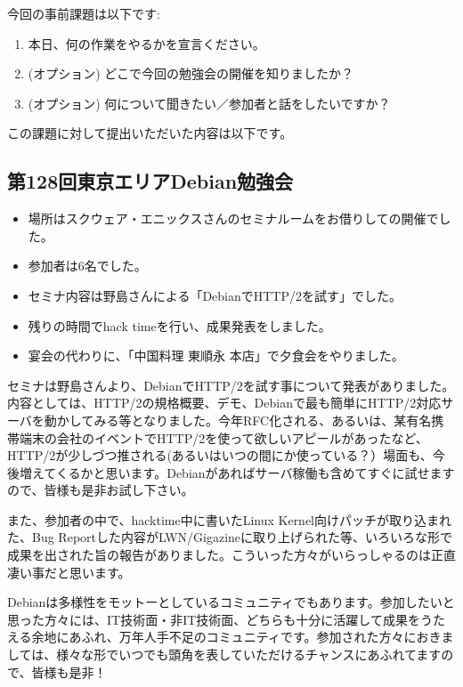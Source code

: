 \documentclass[mingoth,a4paper]{jsarticle}
\begin{document}

今回の事前課題は以下です:
\begin{enumerate}
\item 本日、何の作業をやるかを宣言ください。
\item (オプション) どこで今回の勉強会の開催を知りましたか？
\item (オプション) 何について聞きたい／参加者と話をしたいですか？
\end{enumerate}
この課題に対して提出いただいた内容は以下です。
\begin{multicols}{2}
{\small

}
\end{multicols}


\subsection{第128回東京エリアDebian勉強会}

\begin{itemize}
\item 場所はスクウェア・エニックスさんのセミナルームをお借りしての開催でした。
\item 参加者は6名でした。
\item セミナ内容は野島さんによる「DebianでHTTP/2を試す」でした。
\item 残りの時間でhack timeを行い、成果発表をしました。
\item 宴会の代わりに、「中国料理 東順永 本店」で夕食会をやりました。
\end{itemize} 

 セミナは野島さんより、DebianでHTTP/2を試す事について発表がありました。内容としては、HTTP/2の規格概要、デモ、Debianで最も簡単にHTTP/2対応サーバを動かしてみる等となりました。今年RFC化される、あるいは、某有名携帯端末の会社のイベントでHTTP/2を使って欲しいアピールがあったなど、HTTP/2が少しづつ推される(あるいはいつの間にか使っている？）場面も、今後増えてくるかと思います。Debianがあればサーバ稼働も含めてすぐに試せますので、皆様も是非お試し下さい。

 また、参加者の中で、hacktime中に書いたLinux Kernel向けパッチが取り込まれた、Bug Reportした内容がLWN/Gigazineに取り上げられた等、いろいろな形で成果を出された旨の報告がありました。こういった方々がいらっしゃるのは正直凄い事だと思います。

 Debianは多様性をモットーとしているコミュニティでもあります。参加したいと思った方々には、IT技術面・非IT技術面、どちらも十分に活躍して成果をうたえる余地にあふれ、万年人手不足のコミュニティです。参加された方々におきましては、様々な形でいつでも頭角を表していただけるチャンスにあふれてますので、皆様も是非！
\end{document}
